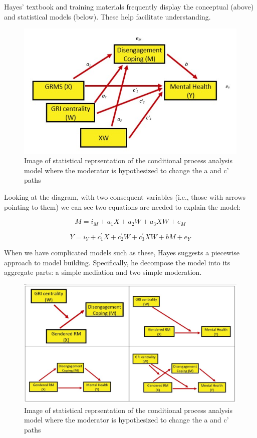 \documentclass[
  11pt,
]{book}
\begin{document}
Hayes' \citeyearpar{hayes_introduction_2018} textbook and training materials frequently display the conceptual (above) and statistical models (below). These help facilitate understanding.

\begin{figure}
\centering
\includegraphics{images/ModMed/LewisStatistical.jpg}
\caption{Image of statistical reprsentation of the conditional process analysis model where the moderator is hypothesized to change the a and c' paths}
\end{figure}

Looking at the diagram, with two consequent variables (i.e., those with arrows pointing to them) we can see two equations are needed to explain the model:

\[M = i_{M}+a_{1}X + a_{2}W + a_{3}XW + e_{M}\]

\[Y = i_{Y}+c_{1}^{'}X+ c_{2}^{'}W+c_{3}^{'}XW+ bM+e_{Y}\]

When we have complicated models such as these, Hayes \citeyearpar{hayes_introduction_2018} suggests a piecewise approach to model building. Specifically, he decompose the model into its aggregate parts: a simple mediation and two simple moderation.

\begin{figure}
\centering
\includegraphics{images/ModMed/PiecewiseAssembly.jpg}
\caption{Image of statistical reprsentation of the conditional process analysis model where the moderator is hypothesized to change the a and c' paths}
\end{figure}
\end{document}
